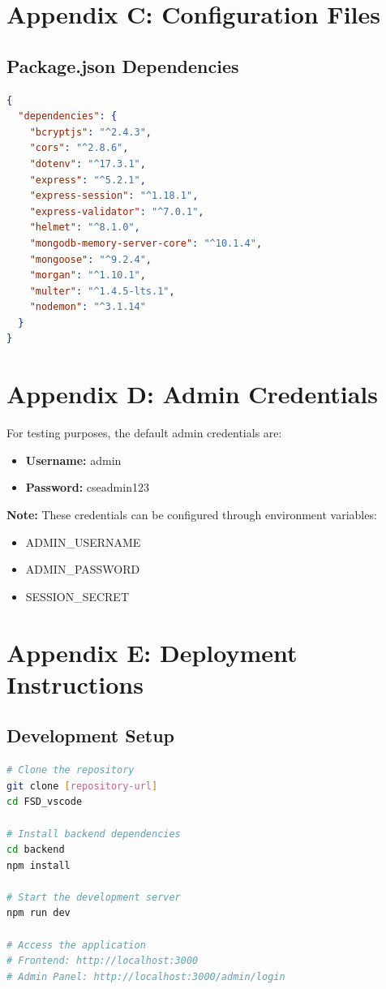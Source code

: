 \documentclass[12pt,a4paper]{report}
\begin{document}
\section{Appendix C: Configuration Files}
\subsection{Package.json Dependencies}
\begin{lstlisting}[language=JSON, caption=Backend Dependencies]
{
  "dependencies": {
    "bcryptjs": "^2.4.3",
    "cors": "^2.8.6",
    "dotenv": "^17.3.1",
    "express": "^5.2.1",
    "express-session": "^1.18.1",
    "express-validator": "^7.0.1",
    "helmet": "^8.1.0",
    "mongodb-memory-server-core": "^10.1.4",
    "mongoose": "^9.2.4",
    "morgan": "^1.10.1",
    "multer": "^1.4.5-lts.1",
    "nodemon": "^3.1.14"
  }
}
\end{lstlisting}

\section{Appendix D: Admin Credentials}
For testing purposes, the default admin credentials are:
\begin{itemize}
    \item \textbf{Username:} admin
    \item \textbf{Password:} cseadmin123
\end{itemize}

\textbf{Note:} These credentials can be configured through environment variables:
\begin{itemize}
    \item ADMIN\_USERNAME
    \item ADMIN\_PASSWORD
    \item SESSION\_SECRET
\end{itemize}

\section{Appendix E: Deployment Instructions}
\subsection{Development Setup}
\begin{lstlisting}[language=bash, caption=Development Setup]
# Clone the repository
git clone [repository-url]
cd FSD_vscode

# Install backend dependencies
cd backend
npm install

# Start the development server
npm run dev

# Access the application
# Frontend: http://localhost:3000
# Admin Panel: http://localhost:3000/admin/login
\end{lstlisting}
\end{document}
